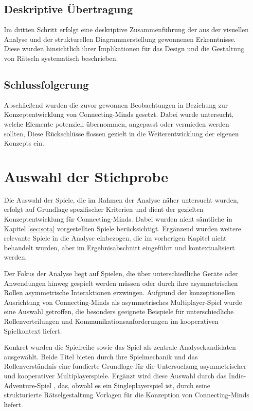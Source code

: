 \subsection{Deskriptive Übertragung}
Im dritten Schritt erfolgt eine deskriptive Zusammenführung der aus der visuellen Analyse und der strukturellen Diagrammerstellung gewonnenen Erkenntnisse. Diese wurden hinsichtlich ihrer Implikationen für das Design und die Gestaltung von Rätseln systematisch beschrieben.

\subsection{Schlussfolgerung}
Abschließend wurden die zuvor gewonnen Beobachtungen in Beziehung zur Konzeptentwicklung von Connecting-Minds gesetzt. Dabei wurde untersucht, welche Elemente potenziell übernommen, angepasst oder vermieden werden sollten, Diese Rückschlüsse flossen gezielt in die Weiterentwicklung der eigenen Konzepts ein.

\section{Auswahl der Stichprobe}
Die Auswahl der Spiele, die im Rahmen der Analyse näher untersucht wurden, erfolgt auf Grundlage spezifischer Kriterien und dient der gezielten Konzeptentwicklung für Connecting-Minds. Dabei wurden nicht sämtliche in Kapitel \ref{sec:sota} vorgestellten Spiele berücksichtigt. Ergänzend wurden weitere relevante Spiele in die Analyse einbezogen, die im vorherigen Kapitel nicht behandelt wurden, aber im Ergebnisabschnitt eingeführt und kontextualisiert werden.

Der Fokus der Analyse liegt auf Spielen, die über unterschiedliche Geräte oder Anwendungen hinweg gespielt werden müssen oder durch ihre asymmetrischen Rollen asymmetrische Interaktionen erzwingen. Aufgrund der konzeptionellen Ausrichtung von Connecting-Minds als asymmetrisches Multiplayer-Spiel wurde eine Auswahl getroffen, die besonders geeignete Beispiele für unterschiedliche Rollenverteilungen und Kommunikationsanforderungen im kooperativen Spielkontext liefert.

Konkret wurden die Spielreihe  sowie das Spiel  als zentrale Analysekandidaten ausgewählt. Beide Titel bieten durch ihre Spielmechanik und das Rollenverständnis eine fundierte Grundlage für die Untersuchung asymmetrischer und kooperativer Multiplayerspiele. Ergänzt wird diese Auswahl durch das Indie-Adventure-Spiel , das, obwohl es ein Singleplayerspiel ist, durch seine strukturierte Rätselgestaltung Vorlagen für die Konzeption von Connecting-Minds liefert.

